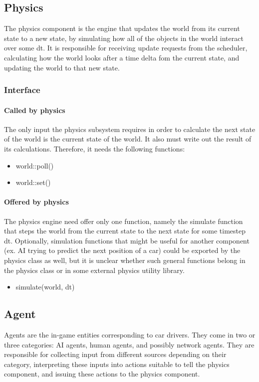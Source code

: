 \documentclass[12pt]{article}
\begin{document}
\subsection{Physics}
The physics component is the engine that updates the world from its current
state to a new state, by simulating how all of the objects in the world
interact over some dt. It is responsible for receiving update requests from the
scheduler, calculating how the world looks after a time delta fom the current
state, and updating the world to that new state.
\subsubsection{Interface}
\paragraph{Called by physics}
The only input the physics subsystem requires in order to calculate the next
state of the world is the current state of the world. It also must write out
the result of its calculations. Therefore, it needs the following functions:
\begin{itemize}
\item world::poll()
\item world::set()
\end{itemize}
\paragraph{Offered by physics}
The physics engine need offer only one function, namely the simulate function
that steps the world from the current state to the next state for some timestep
dt. Optionally, simulation functions that might be useful for another component
(ex. AI trying to predict the next position of a car) could be exported by
the physics class as well, but it is unclear whether such general functions
belong in the physics class or in some external physics utility library.

\begin{itemize}
\item simulate(world, dt)
\end{itemize}

\subsection{Agent}
Agents are the in-game entities corresponding to car drivers. They come in
two or three categories: AI agents, human agents, and possibly network agents.
They are responsible for collecting input from different sources depending on
their category, interpreting these inputs into actions suitable to tell the
physics component, and issuing these actions to the physics component.
\end{document}
